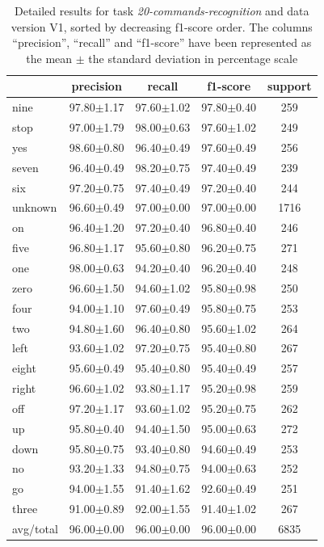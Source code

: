 \documentclass[review]{elsarticle}
\begin{document}
\begin{table} \centering \scriptsize
	\caption{Detailed results for task \textit{20-commands-recognition} and data version V1, sorted by decreasing f1-score order. The columns ``precision'', ``recall'' and ``f1-score'' have been represented as the mean $\pm$ the standard deviation in percentage scale }
	\begin{tabular}{lcccc}
		\toprule
		{} &       precision &          recall &        f1-score & support \\
		\midrule
		nine      &  97.80$\pm$1.17 &  97.60$\pm$1.02 &  97.80$\pm$0.40 &     259 \\
		stop      &  97.00$\pm$1.79 &  98.00$\pm$0.63 &  97.60$\pm$1.02 &     249 \\
		yes       &  98.60$\pm$0.80 &  96.40$\pm$0.49 &  97.60$\pm$0.49 &     256 \\
		seven     &  96.40$\pm$0.49 &  98.20$\pm$0.75 &  97.40$\pm$0.49 &     239 \\
		six       &  97.20$\pm$0.75 &  97.40$\pm$0.49 &  97.20$\pm$0.40 &     244 \\
		unknown   &  96.60$\pm$0.49 &  97.00$\pm$0.00 &  97.00$\pm$0.00 &    1716 \\
		on        &  96.40$\pm$1.20 &  97.20$\pm$0.40 &  96.80$\pm$0.40 &     246 \\
		five      &  96.80$\pm$1.17 &  95.60$\pm$0.80 &  96.20$\pm$0.75 &     271 \\
		one       &  98.00$\pm$0.63 &  94.20$\pm$0.40 &  96.20$\pm$0.40 &     248 \\
		zero      &  96.60$\pm$1.50 &  94.60$\pm$1.02 &  95.80$\pm$0.98 &     250 \\
		four      &  94.00$\pm$1.10 &  97.60$\pm$0.49 &  95.80$\pm$0.75 &     253 \\
		two       &  94.80$\pm$1.60 &  96.40$\pm$0.80 &  95.60$\pm$1.02 &     264 \\
		left      &  93.60$\pm$1.02 &  97.20$\pm$0.75 &  95.40$\pm$0.80 &     267 \\
		eight     &  95.60$\pm$0.49 &  95.40$\pm$0.80 &  95.40$\pm$0.49 &     257 \\
		right     &  96.60$\pm$1.02 &  93.80$\pm$1.17 &  95.20$\pm$0.98 &     259 \\
		off       &  97.20$\pm$1.17 &  93.60$\pm$1.02 &  95.20$\pm$0.75 &     262 \\
		up        &  95.80$\pm$0.40 &  94.40$\pm$1.50 &  95.00$\pm$0.63 &     272 \\
		down      &  95.80$\pm$0.75 &  93.40$\pm$0.80 &  94.60$\pm$0.49 &     253 \\
		no        &  93.20$\pm$1.33 &  94.80$\pm$0.75 &  94.00$\pm$0.63 &     252 \\
		go        &  94.00$\pm$1.55 &  91.40$\pm$1.62 &  92.60$\pm$0.49 &     251 \\
		three     &  91.00$\pm$0.89 &  92.00$\pm$1.55 &  91.40$\pm$1.02 &     267 \\
		\midrule avg/total &  96.00$\pm$0.00 &  96.00$\pm$0.00 &  96.00$\pm$0.00 &    6835 \\
		\bottomrule
	\end{tabular}
	
\end{table}
\end{document}
